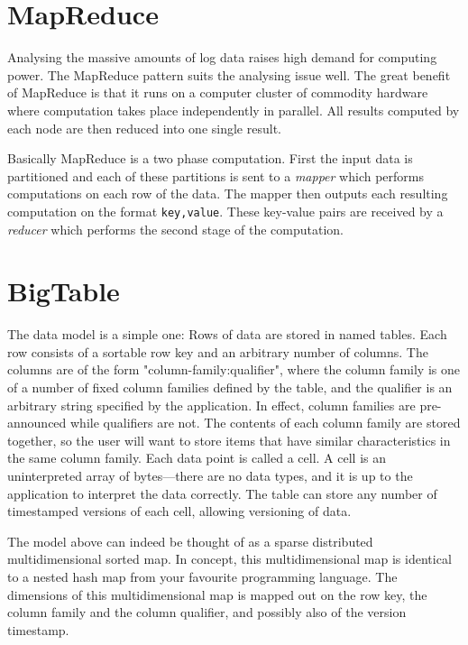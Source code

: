 \documentclass[a4paper,10pt]{book}
\begin{document}
\section{MapReduce}

Analysing the massive amounts of log data raises high demand for computing
power. The MapReduce \cite{mapreduce} pattern suits the analysing issue
well. The great benefit of MapReduce is that it runs on a computer cluster
of commodity hardware where computation takes place independently in
parallel. All results computed by each node are then reduced into one
single result.

Basically MapReduce is a two phase computation. First the input data is
partitioned and each of these partitions is sent to a \textit{mapper} which
performs computations on each row of the data. The mapper then outputs each
resulting computation on the format \texttt{key,value}. These key-value
pairs are received by a \textit{reducer} which performs the second stage of
the computation.


\section{BigTable}

The data model is a simple one: Rows of data are stored in named tables.
Each row consists of a sortable row key and an arbitrary number of columns.
The columns are of the form "column-family:qualifier", where the column
family is one of a number of fixed column families defined by the table,
and the qualifier is an arbitrary string specified by the application. In
effect, column families are pre-announced while qualifiers are not. The
contents of each column family are stored together, so the user will want
to store items that have similar characteristics in the same column family.
Each data point is called a cell. A cell is an uninterpreted array of
bytes---there are no data types, and it is up to the application to
interpret the data correctly. The table can store any number of timestamped
versions of each cell, allowing versioning of data.

The model above can indeed be thought of as a sparse distributed
multidimensional sorted map. In concept, this multidimensional map is
identical to a nested hash map from your favourite programming language. The
dimensions of this multidimensional map is mapped out on the row key, the
column family and the column qualifier, and possibly also of the version
timestamp.
\end{document}

